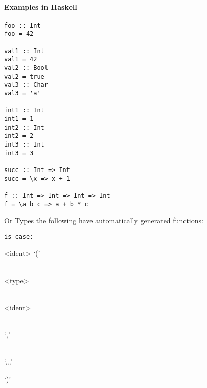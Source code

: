 \documentclass{article}
\def\H{Haskell}
\def\pend{\mbox{} \\\\}
\begin{document}
\paragraph{Examples in \H}
\begin{verbatim}
foo :: Int
foo = 42

val1 :: Int
val1 = 42
val2 :: Bool
val2 = true
val3 :: Char
val3 = 'a'

int1 :: Int
int1 = 1
int2 :: Int
int2 = 2
int3 :: Int
int3 = 3

succ :: Int => Int
succ = \x => x + 1

f :: Int => Int => Int => Int
f = \a b c => a + b * c
\end{verbatim}

Or Types the following have automatically generated functions:

\begin{verbatim}
is_case:
\end{verbatim}

%


%


\begin{syntdiag}
<ident> ‘(’
\begin{rep} \begin{stack} \\
<type> \begin{stack} \\ <ident> \end{stack}
\end{stack} \\ ‘,’ \end{rep}
\begin{stack} \\ ‘...’ \end{stack} ‘)’
\end{syntdiag}
\end{document}
